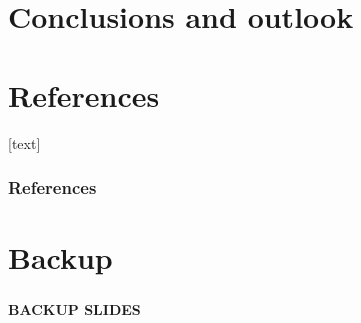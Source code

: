 \documentclass[xcolor=dvipsnames,10pt]{beamer}
\begin{document}
\section{Conclusions and outlook}


\appendix


\section*{References}
[text]

\begin{frame}[allowframebreaks]
\frametitle{References}\footnotesize

%

\end{frame}


\section*{Backup}

\begin{frame}
 \frametitle{}

\begin{center}{\bfseries
BACKUP SLIDES}
\end{center}
\end{frame}
\end{document}
